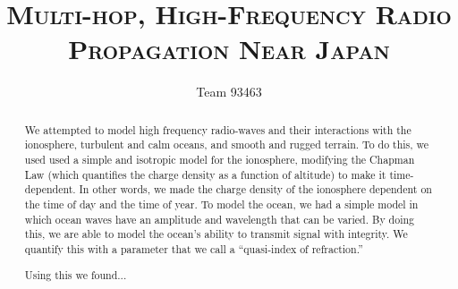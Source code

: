 \documentclass[11pt, twocolumn]{article}
\title{
    \textsc{\LARGE{Multi-hop, High-Frequency Radio Propagation Near Japan}}
    }
\author{\Large Team 93463}
\date{\empty}
\numberwithin{equation}{section}
\begin{document}
    \singlespacing
    \maketitle 
    \thispagestyle{fancy} %




    \begin{abstract}
    We attempted to model high frequency radio-waves and their interactions with the ionosphere, turbulent and calm oceans, and smooth and rugged terrain. To do this, we used used a simple and isotropic model for the ionosphere, modifying the Chapman Law (which quantifies the charge density as a function of altitude) to make it time-dependent. In other words, we made the charge density of the ionosphere dependent on the time of day and the time of year. To model the ocean, we had a simple model in which ocean waves have an  amplitude and wavelength that can be varied. By doing this, we are able to model the ocean's ability to transmit signal with integrity. We quantify this with a parameter that we call a ``quasi-index of refraction.''

    Using this we found...
\end{abstract}

\end{document}
